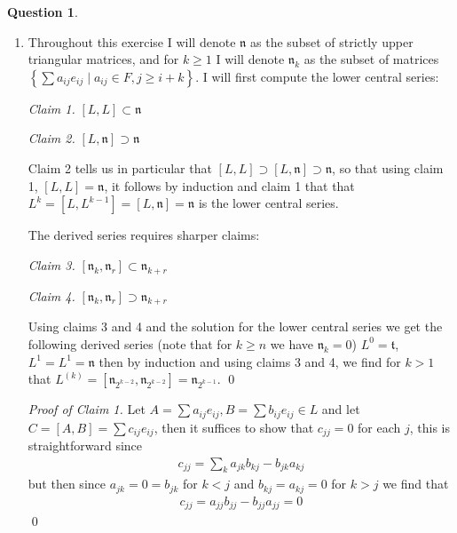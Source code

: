 \documentclass[10.5pt]{article}
\theoremstyle{definition}
\newtheorem{pb}{Question}
\numberwithin{example}{subsection}
\numberwithin{proposition}{subsection}
\newcommand{\set}[1]{\left\{#1\right\}}
\begin{document}
\begin{pb}
\begin{enumerate}
\begin{align}
            \end{align}
            However the central series has \(L^1 = \operatorname{span}_F\set{x}\). It follows by induction that \(L^{k} = [L,L^{k-1}] = [L,\operatorname{span}_F\set{x}] = \operatorname{span}_F(x)\) for all \(k > 1\), hence \(L\) is not nilpotent. If you don't believe me that \(L\) is a lie algebra I give a calculation of the Jacobi identity.
            \begin{align}
                &[x,[x,y]] + [x,[y,x]] + [y,[x,x]] = [x,x] + [x,-x] + [y,0] = 0 + -[x,x] + 0 = 0 \\
                &[y,[x,y]] + [x,[y,y]] + [y,[y,x]] = [y,x] + [x,0] + [y,-x] = [y,x] + 0 - [y,x] = 0
            \end{align} \qed
            \item Throughout this exercise I will denote \(\mathfrak{n}\) as the subset of strictly upper triangular matrices, and for \(k \geq 1\) I will denote \(\mathfrak{n}_k\) as the subset of matrices \(\set{\sum a_{ij}e_{ij}\mid a_{ij} \in F, j \geq i + k}\). I will first compute the lower central series:
            
            \emph{Claim 1.} \([L,L] \subset \mathfrak{n}\)

            \emph{Claim 2.} \([L,\mathfrak{n}] \supset \mathfrak{n}\)

            Claim 2 tells us in particular that \([L,L] \supset [L,\mathfrak{n}] \supset \mathfrak{n}\), so that using claim 1, \([L,L] = \mathfrak{n}\), it follows by induction and claim 1 that that \(L^k = [L,L^{k-1}] = [L,\mathfrak{n}] = \mathfrak{n}\) is the lower central series.

            The derived series requires sharper claims:

            \emph{Claim 3.} \([\mathfrak{n}_k,\mathfrak{n}_r] \subset \mathfrak{n}_{k+r}\)

            \emph{Claim 4.} \([\mathfrak{n}_k,\mathfrak{n}_r] \supset \mathfrak{n}_{k+r}\)

            Using claims 3 and 4 and the solution for the lower central series we get the following derived series (note that for \(k \geq n\) we have \(\mathfrak{n}_k = 0\)) \(L^{0} = \mathfrak{t}\), \(L^{1} = L^1 = \mathfrak{n}\) then by induction and using claims 3 and 4, we find for \(k > 1\) that \(L^{(k)} = [\mathfrak{n}_{2^{k-2}},\mathfrak{n}_{2^{k-2}}] = \mathfrak{n}_{2^{k-1}}\). \qed

            \emph{Proof of Claim 1.} Let \(A = \sum a_{ij}e_{ij}, B = \sum b_{ij}e_{ij} \in L\) and let \(C = [A,B] = \sum c_{ij}e_{ij}\), then it suffices to show that \(c_{jj} = 0\) for each \(j\), this is straightforward since
            \begin{align}
                c_{jj} = \sum_k a_{jk}b_{kj} - b_{jk}a_{kj}
            \end{align}
            but then since \(a_{jk} = 0 = b_{jk}\) for \(k < j\) and \(b_{kj} = a_{kj} = 0\) for \(k > j\) we find that
            \begin{align}
                c_{jj} = a_{jj}b_{jj} - b_{jj}a_{jj} = 0
            \end{align} \qed


\end{enumerate}
\end{pb}
\end{document}
